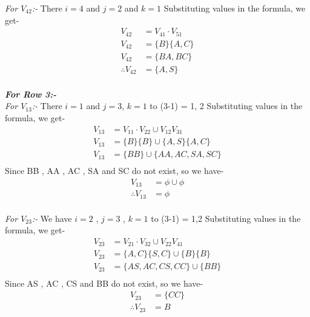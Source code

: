 \documentclass[12pt]{book}
\begin{document}
\textit{For $V_{42}$:-}\newline
There $i = 4$ and  $j = 2$ and $k = 1$\newline
Substituting values in the formula, we get-
\begin{align*}
V_{42} &= V_{41} \cdot V_{51}\\
V_{42} &= \{ B \} \{ A, C \}\\
V_{42} &= \{ BA, BC \}\\
\therefore V_{42} &= \{ A, S \}\\
\end{align*}

\textbf{\textit{For Row 3:-}}\\
\textit{For $V_{13}$:-}\newline
There $i = 1$ and  $j = 3$, $k = 1$ to (3-1) = 1, 2\newline
Substituting values in the formula, we get-
\begin{align*}
V_{13} &= V_{11} \cdot V_{22} \cup V_{12} V_{31}\\
V_{13} &= \{ B \} \{ B \} \cup \{ A , S \} \{ A , C \}\\
V_{13} &= \{BB\} \cup \{ AA, AC, SA, SC \}\\
\end{align*}
Since BB , AA , AC , SA and SC do not exist, so we have-
\begin{align*}
V_{13} &= \phi \cup \phi\\
\therefore V_{13} &= \phi\\
\end{align*}

\textit{For $V_{23}$:-}\newline
We have $i = 2$ , $j = 3$ , $k = 1$ to (3-1) = 1,2\newline
Substituting values in the formula, we get-
\begin{align*}
V_{23} &= V_{21} \cdot V_{32} \cup V_{22} V_{41}\\
V_{23} &= \{ A, C \} \{ S, C \} \cup \{ B \} \{ B \}\\
V_{23} &= \{AS, AC, CS, CC\} \cup \{ BB \}\\
\end{align*}
Since AS , AC , CS and BB do not exist, so we have-
\begin{align*}
V_{23} &= \{ CC \}\\
\therefore V_{23} &= B
\end{align*}
\end{document}
